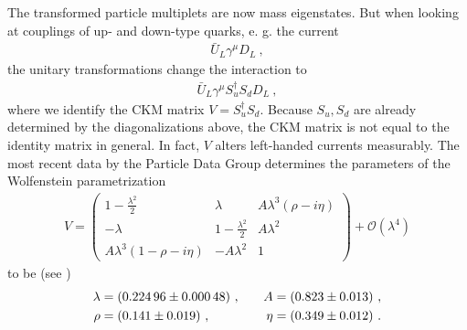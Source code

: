 The transformed particle multiplets are now mass eigenstates. But when looking at couplings of up- and down-type quarks, e. g. the current
\begin{align*}
	\bar{U}_L\gamma^\mu D_L \ ,
\end{align*}
the unitary transformations change the interaction to
\begin{align*}
	\bar{U}_L\gamma^\mu S_u^\dagger S_d D_L \ ,
\end{align*}
where we identify the CKM matrix $V=S_u^\dagger S_d$. Because $S_u,S_d$ are already determined by the diagonalizations above, the CKM matrix is not equal to the identity matrix in general. In fact, $V$ alters left-handed currents measurably. The most recent data by the Particle Data Group determines the parameters of the Wolfenstein parametrization
\begin{align*}
	V = \begin{pmatrix}
	1-\frac{\lambda^2}{2} & \lambda & A\lambda^3(\rho-i\eta) \\
	-\lambda & 1-\frac{\lambda^2}{2} & A\lambda^2 \\
	A\lambda^3(1-\rho-i\eta) & -A\lambda^2 & 1
	\end{pmatrix} + \mathcal{O}(\lambda^4)
\end{align*}
to be (see \cite[Chapter 12]{PDG}\footnotemark)
\begin{align}\label{eq:Wolf}
	\lambda &= \SI{0.22496(48)}{} \ , && &A &= \SI{0.823(13)}{} \ , \notag \\
	\rho &= \SI{0.141(19)}{} \ , && &\eta &= \SI{0.349(12)}{} \ .
\end{align}
